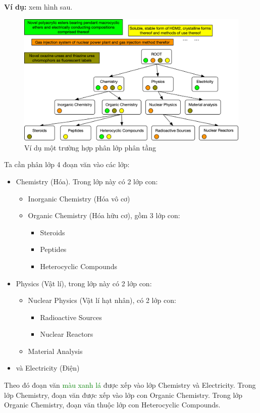 \documentclass[12pt]{article}
\begin{document}
\textbf{Ví dụ:} xem hình sau.
\begin{figure}[H]
    \centering
    \includegraphics[scale=.5]{img/structure-demo.png}
    \caption{Ví dụ một trường hợp phân lớp phân tầng\cite{huang2019hierarchical}}
    \label{fig:example_hmtc}
\end{figure}
Ta cần phân lớp 4 đoạn văn vào các lớp:
\begin{itemize}
\item Chemistry (Hóa). Trong lớp này có 2 lớp con:
\begin{itemize}
    \item Inorganic Chemistry (Hóa vô cơ)
    \item Organic Chemistry (Hóa hữu cơ), gồm 3 lớp con:
    \begin{itemize}
        \item Steroids
        \item Peptides
        \item Heterocyclic Compounds
    \end{itemize}
\end{itemize}
\item Physics (Vật lí), trong lớp này có 2 lớp con:
\begin{itemize}
    \item Nuclear Physics (Vật lí hạt nhân), có 2 lớp con:
    \begin{itemize}
        \item Radioactive Sources
        \item Nuclear Reactors
    \end{itemize}
    \item Material Analysis
\end{itemize}
\item và Electricity (Điện)
\end{itemize}
Theo đó đoạn văn \textcolor{green}{màu xanh lá} được xếp vào lớp Chemistry và Electricity. Trong lớp Chemistry, đoạn văn được xếp vào lớp con Organic Chemistry. Trong lớp Organic Chemistry, đoạn văn thuộc lớp con Heterocyclic Compounds.
\end{document}
